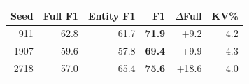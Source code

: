 \begin{tabular}{@{}rrrrrr@{}}
\toprule
Seed & Full F1 & Entity F1 & \proofkv{} F1 & $\Delta$Full & KV\% \\
\midrule
911 & 62.8 & 61.7 & \textbf{71.9} & +9.2 & 4.2 \\
1907 & 59.6 & 57.8 & \textbf{69.4} & +9.9 & 4.3 \\
2718 & 57.0 & 65.4 & \textbf{75.6} & +18.6 & 4.0 \\
\bottomrule
\end{tabular}

